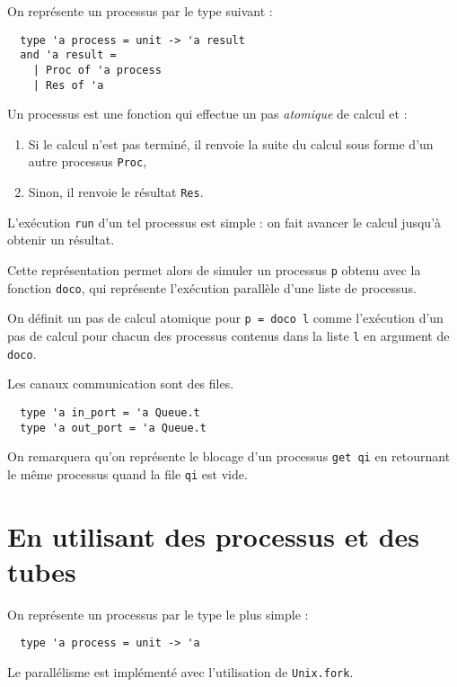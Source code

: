 \documentclass[11pt]{article}
\begin{document}
On repr\'esente un processus par le type suivant :

\begin{lstlisting}
  type 'a process = unit -> 'a result
  and 'a result =
    | Proc of 'a process
    | Res of 'a
\end{lstlisting}

Un processus est une fonction qui effectue
un pas {\em atomique} de calcul et :

\begin{enumerate}
  \item Si le calcul n'est pas termin\'e,
    il renvoie la suite du calcul sous forme d'un autre processus {\tt Proc},
  \item Sinon, il renvoie le r\'esultat {\tt Res}.
\end{enumerate}

L'ex\'ecution {\tt run} d'un tel processus est simple :
on fait avancer le calcul jusqu'\`a obtenir un r\'esultat.

\smallskip

Cette repr\'esentation permet alors de simuler un processus {\tt p}
obtenu avec la fonction {\tt doco}, qui repr\'esente l'ex\'ecution
parall\`ele d'une liste de processus.

On d\'efinit un pas de calcul atomique pour {\tt p = doco l}
comme l'ex\'ecution d'un pas de calcul pour chacun des processus
contenus dans la liste {\tt l} en argument de {\tt doco}.

\smallskip

Les canaux communication sont des files.

\begin{lstlisting}
  type 'a in_port = 'a Queue.t
  type 'a out_port = 'a Queue.t
\end{lstlisting}

On remarquera qu'on repr\'esente le blocage d'un processus {\tt get qi}
en retournant le m\^eme processus quand la file {\tt qi} est vide.

\section{En utilisant des processus et des tubes}

On repr\'esente un processus par le type le plus simple :

\begin{lstlisting}
  type 'a process = unit -> 'a
\end{lstlisting}

Le parall\'elisme est impl\'ement\'e avec l'utilisation de {\tt Unix.fork}.
\end{document}
